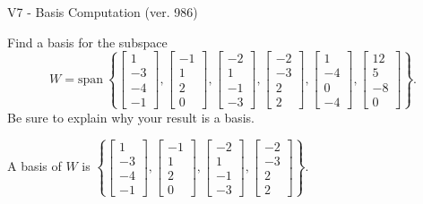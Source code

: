 \begin{exercise}
  \begin{exerciseTitle}V7 - Basis Computation (ver. 986)\end{exerciseTitle}
  \begin{exerciseStatement}
    Find a basis for the subspace 
\[W=\mathrm{span}\ \left\{\left[\begin{array}{r}
1 \\
-3 \\
-4 \\
-1
\end{array}\right] , \left[\begin{array}{r}
-1 \\
1 \\
2 \\
0
\end{array}\right] , \left[\begin{array}{r}
-2 \\
1 \\
-1 \\
-3
\end{array}\right] , \left[\begin{array}{r}
-2 \\
-3 \\
2 \\
2
\end{array}\right] , \left[\begin{array}{r}
1 \\
-4 \\
0 \\
-4
\end{array}\right] , \left[\begin{array}{r}
12 \\
5 \\
-8 \\
0
\end{array}\right]\right\}.\]
 Be sure to explain why your result is a basis.


  \end{exerciseStatement}
  \begin{exerciseAnswer}
   A basis of \(W\) is  \(\left\{\left[\begin{array}{r}
1 \\
-3 \\
-4 \\
-1
\end{array}\right] , \left[\begin{array}{r}
-1 \\
1 \\
2 \\
0
\end{array}\right] , \left[\begin{array}{r}
-2 \\
1 \\
-1 \\
-3
\end{array}\right] , \left[\begin{array}{r}
-2 \\
-3 \\
2 \\
2
\end{array}\right]\right\}\).
  


  \end{exerciseAnswer}
\end{exercise}